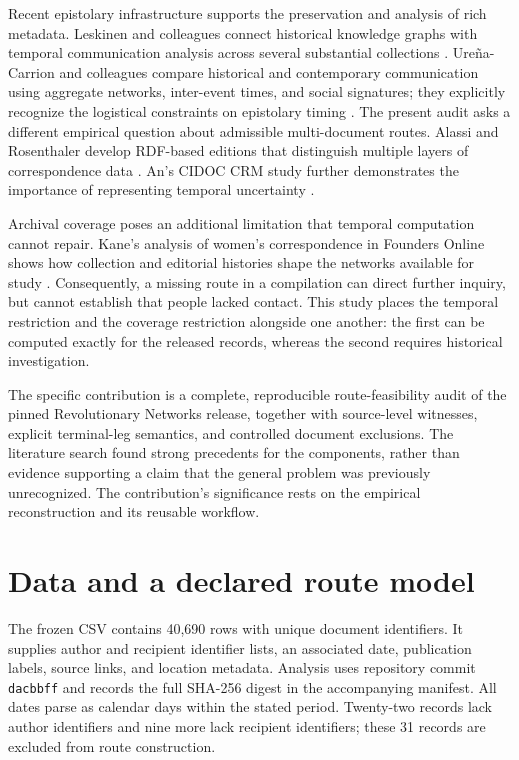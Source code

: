 \documentclass[11pt]{article}
\begin{document}
Recent epistolary infrastructure supports the preservation and analysis of rich metadata. Leskinen and colleagues connect historical knowledge graphs with temporal communication analysis across several substantial collections \cite{leskinen}. Ure\~na-Carrion and colleagues compare historical and contemporary communication using aggregate networks, inter-event times, and social signatures; they explicitly recognize the logistical constraints on epistolary timing \cite{urena}. The present audit asks a different empirical question about admissible multi-document routes. Alassi and Rosenthaler develop RDF-based editions that distinguish multiple layers of correspondence data \cite{alassi}. An's CIDOC CRM study further demonstrates the importance of representing temporal uncertainty \cite{an}.

Archival coverage poses an additional limitation that temporal computation cannot repair. Kane's analysis of women's correspondence in Founders Online shows how collection and editorial histories shape the networks available for study \cite{kane}. Consequently, a missing route in a compilation can direct further inquiry, but cannot establish that people lacked contact. This study places the temporal restriction and the coverage restriction alongside one another: the first can be computed exactly for the released records, whereas the second requires historical investigation.

The specific contribution is a complete, reproducible route-feasibility audit of the pinned Revolutionary Networks release, together with source-level witnesses, explicit terminal-leg semantics, and controlled document exclusions. The literature search found strong precedents for the components, rather than evidence supporting a claim that the general problem was previously unrecognized. The contribution's significance rests on the empirical reconstruction and its reusable workflow.

\section{Data and a declared route model}
The frozen CSV contains 40,690 rows with unique document identifiers. It supplies author and recipient identifier lists, an associated date, publication labels, source links, and location metadata. Analysis uses repository commit \texttt{dacbbff} and records the full SHA-256 digest in the accompanying manifest. All dates parse as calendar days within the stated period. Twenty-two records lack author identifiers and nine more lack recipient identifiers; these 31 records are excluded from route construction.
\end{document}
